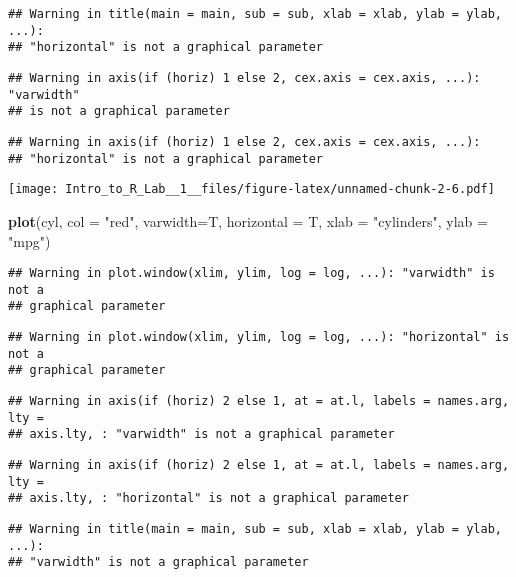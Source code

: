 \documentclass[]{article}
\newenvironment{Shaded}{\begin{snugshade}}{\end{snugshade}}
\newcommand{\KeywordTok}[1]{\textcolor[rgb]{0.13,0.29,0.53}{\textbf{#1}}}
\newcommand{\DataTypeTok}[1]{\textcolor[rgb]{0.13,0.29,0.53}{#1}}
\newcommand{\StringTok}[1]{\textcolor[rgb]{0.31,0.60,0.02}{#1}}
\newcommand{\NormalTok}[1]{#1}
\begin{document}
\begin{verbatim}
## Warning in title(main = main, sub = sub, xlab = xlab, ylab = ylab, ...):
## "horizontal" is not a graphical parameter
\end{verbatim}

\begin{verbatim}
## Warning in axis(if (horiz) 1 else 2, cex.axis = cex.axis, ...): "varwidth"
## is not a graphical parameter
\end{verbatim}

\begin{verbatim}
## Warning in axis(if (horiz) 1 else 2, cex.axis = cex.axis, ...):
## "horizontal" is not a graphical parameter
\end{verbatim}

\texttt{[image: Intro\_to\_R\_Lab\_\_1\_\_files/figure-latex/unnamed-chunk-2-6.pdf]}

\begin{Shaded}
\begin{Highlighting}[]
\KeywordTok{plot}\NormalTok{(cyl, }\DataTypeTok{col =} \StringTok{"red"}\NormalTok{, }\DataTypeTok{varwidth=}\NormalTok{T, }\DataTypeTok{horizontal =}\NormalTok{ T, }\DataTypeTok{xlab =} \StringTok{"cylinders"}\NormalTok{, }\DataTypeTok{ylab =} \StringTok{"mpg"}\NormalTok{)}
\end{Highlighting}
\end{Shaded}

\begin{verbatim}
## Warning in plot.window(xlim, ylim, log = log, ...): "varwidth" is not a
## graphical parameter
\end{verbatim}

\begin{verbatim}
## Warning in plot.window(xlim, ylim, log = log, ...): "horizontal" is not a
## graphical parameter
\end{verbatim}

\begin{verbatim}
## Warning in axis(if (horiz) 2 else 1, at = at.l, labels = names.arg, lty =
## axis.lty, : "varwidth" is not a graphical parameter
\end{verbatim}

\begin{verbatim}
## Warning in axis(if (horiz) 2 else 1, at = at.l, labels = names.arg, lty =
## axis.lty, : "horizontal" is not a graphical parameter
\end{verbatim}

\begin{verbatim}
## Warning in title(main = main, sub = sub, xlab = xlab, ylab = ylab, ...):
## "varwidth" is not a graphical parameter
\end{verbatim}
\end{document}
